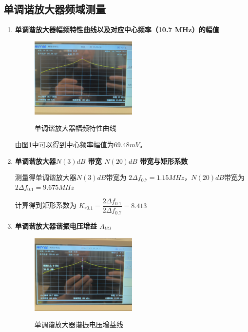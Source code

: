\documentclass[UTF8]{ctexart}
\begin{document}
\subsection{单调谐放大器频域测量}
\begin{enumerate}[(1)]
    \item \noindent \textbf{单调谐放大器幅频特性曲线以及对应中心频率（10.7 MHz）的幅值}
    \begin{figure}[H]
        \centering
        \includegraphics[width=0.5\textwidth]{pics/3.1.1.png}
        ~\\
        \caption{单调谐放大器幅频特性曲线}\label{fig:3.1.1}
    \end{figure}

    由图\ref{fig:3.1.1}中可以得到中心频率幅值为$69.48mV$。
    
    \item \noindent \textbf{单调谐放大器$N(3)dB$ 带宽 $N(20)dB$ 带宽与矩形系数}
    
    测量得单调谐放大器$N(3)dB$带宽为
    $2\Delta f_{0.7}=1.15MHz$，$N(20)dB$带宽为
    $2\Delta f_{0.1}=9.675MHz$

    计算得到矩形系数为
    $K_{r0.1}=\dfrac{2\Delta f_{0.1}}{2\Delta f_{0.7}}=8.413$
    
    \item \noindent \textbf{单调谐放大器谐振电压增益 $A_{VO}$}    
    \begin{figure}[H]
        \centering
        \includegraphics[width=0.5\textwidth]{pics/3.1.3.png}
        ~\\
        \caption{单调谐放大器谐振电压增益线}\label{fig:3.1.3}
    \end{figure}


\end{enumerate}
\end{document}

